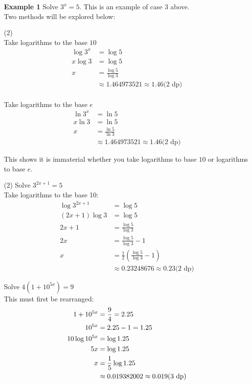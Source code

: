 \textbf{Example 1} Solve $3^{x} =5$. This is an example of case $3$ above.\medskip\\ 
\solution Two methods will be explored below:
\begin{tasks}[label-width={5em}](2)
\task[Method 1] \\Take logarithms to the base $10$\\
\begin{align*}\log  3^{x} &  = \log  5 \\
x \log  3 &  = \log  5 \\
x &  = \frac{\log  5}{\log  3} \\
&  \approx 1.464973521 \approx 1.46\text{(2 dp)}\end{align*}
\task[Method 2] \\Take logarithms to the base $e$\\
\begin{align*}\ln  3^{x} &  = \ln  5 \\
x \ln  3 &  = \ln  5 \\
x &  = \frac{\ln  5}{\ln  3} \\
&  \approx 1.464973521 \approx 1.46\text{(2 dp)}\end{align*}
\end{tasks}
This shows it is immaterial whether you take logarithms to base $10$ or logarithms to base $e$. 
\begin{tasks}[label-width={6em}](2)
\task[Example 2]
Solve $3^{2 x +1} =5$\\
\solution Take logarithms to the base 10:
\begin{align*}\log  3^{2 x +1} &  = \log  5 \\
\left (2 x +1\right ) \log  3 &  = \log  5 \\
2 x +1 &  = \frac{\log  5}{\log  3} \\
2 x &  = \frac{\log  5}{\log  3} -1 \\
x &  = \frac{1}{2} \left (\frac{\log  5}{\log  3} -1\right ) \\
&  \approx 0.23248676 \approx 0.23\text{(2 dp)}\end{align*}

\task[Example 3]
Solve $4 \left (1 +10^{5 x}\right ) =9$\\
\solution This must first be rearranged:
\begin{align*}1 +10^{5 x} &  = \frac{9}{4} =2.25 \\
10^{5 x} &  = 2.25 -1 =1.25 \\
\text{}{\scriptsize 10}\text{}\log  10^{5 x} &  = \log  1.25 \\
5 x &  = \log  1.25 \\
x &  = \frac{1}{5} \log  1.25 \\
&  \approx 0.019382002 \approx 0.019\text{(3 dp)}\end{align*}
\end{tasks}

